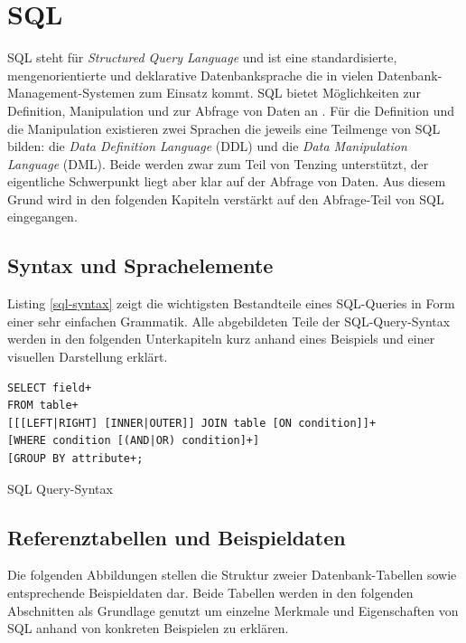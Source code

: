 \documentclass[a4paper]{article}
\begin{document}
\newpage
\section{SQL}
\label{sec:sql}
SQL steht für \textit{Structured Query Language} und ist eine standardisierte, mengenorientierte und deklarative Datenbanksprache die in vielen Datenbank-Management-Systemen zum Einsatz kommt. SQL bietet Möglichkeiten zur Definition, Manipulation und zur Abfrage von Daten an \cite{Codd}. Für die Definition und die Manipulation existieren zwei Sprachen die jeweils eine Teilmenge von SQL bilden: die \textit{Data Definition Language} (DDL) und die \textit{Data Manipulation Language} (DML). Beide werden zwar zum Teil von Tenzing unterstützt, der eigentliche Schwerpunkt liegt aber klar auf der Abfrage von Daten. Aus diesem Grund wird in den folgenden Kapiteln verstärkt auf den Abfrage-Teil von SQL eingegangen.

\subsection{Syntax und Sprachelemente}
Listing \ref{sql-syntax} zeigt die wichtigsten Bestandteile eines SQL-Queries in Form einer sehr einfachen Grammatik. Alle abgebildeten Teile der SQL-Query-Syntax werden in den folgenden Unterkapiteln kurz anhand eines Beispiels und einer visuellen Darstellung erklärt.

\begin{listing}[H]
\begin{verbatim}
SELECT field+
FROM table+
[[[LEFT|RIGHT] [INNER|OUTER]] JOIN table [ON condition]]+
[WHERE condition [(AND|OR) condition]+]
[GROUP BY attribute+;
\end{verbatim}
\caption{SQL Query-Syntax}
\label{sql-syntax}
\end{listing}

\newpage
\subsection{Referenztabellen und Beispieldaten}
Die folgenden Abbildungen stellen die Struktur zweier Datenbank-Tabellen sowie entsprechende Beispieldaten dar. Beide Tabellen werden in den folgenden Abschnitten als Grundlage genutzt um einzelne Merkmale und Eigenschaften von SQL anhand von konkreten Beispielen zu erklären.
\end{document}
